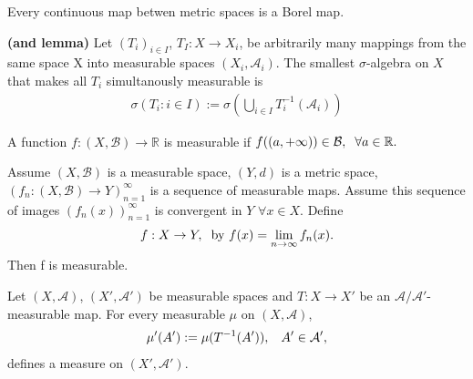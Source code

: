     \begin{corollary}
        Every continuous map betwen metric spaces is a Borel map.
    \end{corollary}

    \begin{definition}
        \textbf{(and lemma)}
        Let $(T_i)_{i\in I}$, $T_I:X\rightarrow X_i$, be arbitrarily many mappings from the same space X into measurable spaces $(X_i,\mathcal A_i).$ The smallest $\sigma$-algebra on $X$ that makes all $T_i$ simultanously measurable is 
        \begin{align}
            \sigma(T_i:i\in I) := \sigma \left( \bigcup_{i\in I}T_i^{-1}(\mathcal A_i)\right)
        \end{align}

    \end{definition}
	
    \begin{corollary}
        A function $f:(X,\mathcal B)\rightarrow \mathbb R$ is measurable if $f((a,+\infty))\in \mathcal B,\hspace{2mm}\forall a\in \mathbb R.$
    \end{corollary}

    \begin{corollary}
        Assume $(X,\mathcal B)$ is a measurable space, $(Y,d)$ is a metric space, $(f_n:(X,\mathcal B)\rightarrow Y)_{n=1}^\infty$ is a sequence of measurable maps.
        Assume this sequence of images $(f_n(x))_{n=1}^\infty$ is convergent in $Y$ $\forall x\in X$.
        Define \begin{align}
            f:X\rightarrow Y,\hspace{2mm}\text{by  } f(x)=\lim_{n\rightarrow \infty} f_n(x).
        \end{align}
        Then f is measurable.
    \end{corollary}

    \begin{theorem}
        Let $(X,\mathcal A)$, $(X',\mathcal A')$ be measurable spaces and $T:X\rightarrow X'$ be an $\mathcal A/\mathcal A'$-measurable map. For every measurable $\mu$ on $(X,\mathcal A)$, 
        \begin{align}
            \mu'(A') := \mu (T^{-1}(A')),\hspace{3mm} A'\in \mathcal A',
        \end{align}
        defines a measure on $(X',\mathcal A')$.
    \end{theorem}

